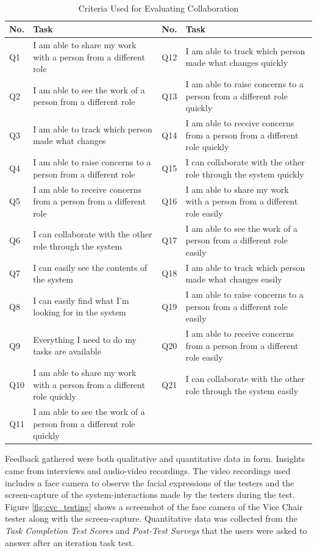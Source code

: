 \begin{table}
  \centering
  \caption{Criteria Used for Evaluating Collaboration}~\label{tab:itr2_questions}
  \addtolength{\tabcolsep}{2pt} 
  \begin{tabular}{p{.5cm}|p{2.75cm}|p{.5cm}|p{2.70cm}}
  	\toprule
    \rule{0pt}{8pt}No. & Task & No. & Task\\[2pt]
    \toprule
    Q1 & I am able to share my work with a person from a different role &  Q12 & I am able to track which person made what changes quickly\\
    Q2 &  I am able to see the work of a person from a different role  & Q13 & I am able to raise concerns to a person from a different role quickly\\
    Q3 & I am able to track which person made what changes & Q14 & I am able to receive concerns from a person from a different role quickly\\
    Q4 & I am able to raise concerns to a person from a different role & Q15 & I can collaborate with the other role through the system quickly\\
    Q5 & I am able to receive concerns from a person from a different role & Q16 & I am able to share my work with a person from a different role easily\\
    Q6 & I can collaborate with the other role through the system & Q17 & I am able to see the work of a person from a different role easily\\
    Q7 & I can easily see the contents of the system & Q18 & I am able to track which person made what changes easily\\
    Q8 & I can easily find what I'm looking for in the system & Q19 & I am able to raise concerns to a person from a different role easily\\
    Q9 & Everything I need to do my tasks are available  & Q20 & I am able to receive concerns from a person from a different role easily\\
    Q10 & I am able to share my work with a person from a different role quickly & Q21 & I can collaborate with the other role through the system easily\\
    Q11 & I am able to see the work of a person from a different role quickly & & \\
    \bottomrule
  \end{tabular}
  \addtolength{\tabcolsep}{-2pt} 
\end{table}
Feedback gathered were both qualitative and quantitative data in form. Insights came from interviews and audio-video recordings. The video recordings used includes a face camera to observe the facial expressions of the testers and the screen-capture of the system-interactions made by the testers during the test. Figure \ref{fig:cvc_testing} shows a screenshot of the face camera of the Vice Chair tester along with the screen-capture. Quantitative data was collected from the \textit{Task Completion Test Scores} and \textit{Post-Test Surveys} that the users were asked to answer after an iteration task test. 

